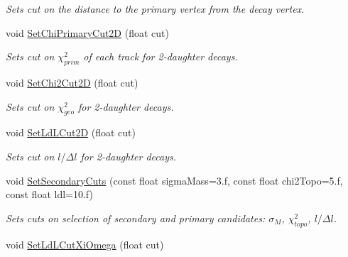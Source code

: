 \begin{DoxyCompactItemize}
\begin{DoxyCompactList}\small\item\em Sets cut on the distance to the primary vertex from the decay vertex. \end{DoxyCompactList}\item 
void \hyperlink{classKFParticleFinder_ab040f949a192af333a7677f6fd838985}{Set\+Chi\+Primary\+Cut2D} (float cut)\hypertarget{classKFParticleFinder_ab040f949a192af333a7677f6fd838985}{}\label{classKFParticleFinder_ab040f949a192af333a7677f6fd838985}

\begin{DoxyCompactList}\small\item\em Sets cut on $\chi^2_{prim}$ of each track for 2-\/daughter decays. \end{DoxyCompactList}\item 
void \hyperlink{classKFParticleFinder_a6dfd01104eac45afa1c8f737e147d799}{Set\+Chi2\+Cut2D} (float cut)\hypertarget{classKFParticleFinder_a6dfd01104eac45afa1c8f737e147d799}{}\label{classKFParticleFinder_a6dfd01104eac45afa1c8f737e147d799}

\begin{DoxyCompactList}\small\item\em Sets cut on $\chi^2_{geo}$ for 2-\/daughter decays. \end{DoxyCompactList}\item 
void \hyperlink{classKFParticleFinder_a696e16a5e722adacbf6f301152ac1915}{Set\+Ld\+L\+Cut2D} (float cut)\hypertarget{classKFParticleFinder_a696e16a5e722adacbf6f301152ac1915}{}\label{classKFParticleFinder_a696e16a5e722adacbf6f301152ac1915}

\begin{DoxyCompactList}\small\item\em Sets cut on $l/\Delta l$ for 2-\/daughter decays. \end{DoxyCompactList}\item 
void \hyperlink{classKFParticleFinder_a0e9185d0f203bf3fc5d945502d23feba}{Set\+Secondary\+Cuts} (const float sigma\+Mass=3.f, const float chi2\+Topo=5.f, const float ldl=10.f)\hypertarget{classKFParticleFinder_a0e9185d0f203bf3fc5d945502d23feba}{}\label{classKFParticleFinder_a0e9185d0f203bf3fc5d945502d23feba}

\begin{DoxyCompactList}\small\item\em Sets cuts on selection of secondary and primary candidates\+: $\sigma_{M}$, $\chi^2_{topo}$, $l/\Delta l$. \end{DoxyCompactList}\item 
void \hyperlink{classKFParticleFinder_a494638210c408af2f4f6b272d766510a}{Set\+Ld\+L\+Cut\+Xi\+Omega} (float cut)\hypertarget{classKFParticleFinder_a494638210c408af2f4f6b272d766510a}{}\label{classKFParticleFinder_a494638210c408af2f4f6b272d766510a}


\end{DoxyCompactItemize}
